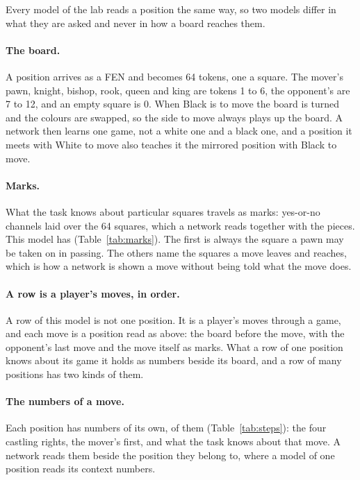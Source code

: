 Every model of the lab reads a position the same way, so two models differ in
what they are asked and never in how a board reaches them.

\paragraph{The board.}
A position arrives as a FEN and becomes 64 tokens, one a square. The mover's
pawn, knight, bishop, rook, queen and king are tokens 1 to 6, the opponent's
are 7 to 12, and an empty square is 0. When Black is to move the board is
turned and the colours are swapped, so the side to move always plays up the
board. A network then learns one game, not a white one and a black one, and a
position it meets with White to move also teaches it the mirrored position
with Black to move.

\paragraph{Marks.}
What the task knows about particular squares travels as marks: yes-or-no
channels laid over the 64 squares, which a network reads together with the
pieces. This model has  (Table~\ref{tab:marks}). The first
is always the square a pawn may be taken on in passing. The others name the
squares a move leaves and reaches, which is how a network is shown a move
without being told what the move does.

\ifsequence
\paragraph{A row is a player's moves, in order.}
A row of this model is not one position. It is a player's moves through a
game, and each move is a position read as above: the board before the move,
with the opponent's last move and the move itself as marks. What a row of one
position knows about its game it holds as numbers beside its board, and a row
of many positions has two kinds of them.

\paragraph{The numbers of a move.}
Each position has numbers of its own,  of them
(Table~\ref{tab:steps}): the four castling rights, the mover's first, and what
the task knows about that move. A network reads them beside the position they
belong to, where a model of one position reads its context numbers.

